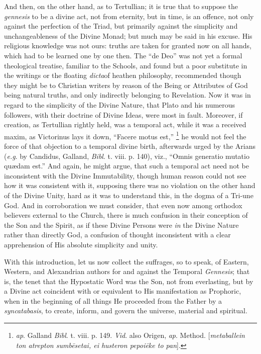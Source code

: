 And then, on the other hand, as to Tertullian; it is true that to
suppose the \emph{gennesis} to be a divine act, not from eternity, but
in time, is an offence, not only against the perfection of the Triad,
but primarily against the simplicity and unchangeableness of the
Divine Monad; but much may be said in his excuse. His religious
knowledge was not ours: truths are taken for granted now on all hands,
which had to be learned one by one then. The ``de Deo'' was
not yet a formal theological treatise, familiar to the Schools, and
found but a poor substitute in the writings or the floating \emph{dicta}of
heathen philosophy, recommended though they might be to Christian
writers by reason of the Being or Attributes of God being natural
truths, and only indirectly belonging to Revelation. Now it was in
regard to the simplicity of the Divine Nature, that Plato and his
numerous followers, with their doctrine of Divine Ideas, were most in
fault. Moreover, if creation, as Tertullian rightly held, was a
temporal act, while it was a received maxim, as Victorinus lays it
down, ``Facere motus est,'' \footnote{\emph{ap}.
Galland \emph{Bibl}. t. viii. p. 149. \emph{Vid}. also Origen, \emph{ap}.
Method. [\emph{metaballein ton atrepton sumb\={e}setai, ei husteron
pepoi\={e}ke to pan}].} he would not feel the force of that objection to a temporal
divine birth, afterwards urged by the Arians (\emph{e.g}. by Candidus,
Galland, \emph{Bibl}. t. viii. p. 140), viz., ``Omnis generatio
mutatio quædam est.'' And again, he might argue, that such a
temporal act need not be inconsistent with the Divine Immutability,
though human reason could not see how it was consistent with it,
supposing there was no violation on the other hand of the Divine
Unity, hard as it was to understand this, in the dogma of a Tri-une
God. And in corroboration we must consider, that even now among
orthodox believers external to the Church, there is much confusion in
their conception of the Son and the Spirit, as if these Divine Persons
were \emph{in} the Divine Nature rather than directly God, a confusion
of thought inconsistent with a clear apprehension of His absolute
simplicity and unity.

With this introduction, let us now collect the suffrages, so to
speak, of Eastern, Western, and Alexandrian authors for and against
the Temporal \emph{Gennesis}; that is, the tenet that the Hypostatic
Word was the Son, not from everlasting, but by a Divine act coincident
with or equivalent to His manifestation as Prophoric, when in the
beginning of all things He proceeded from the Father by a \emph{syncatabasis},
to create, inform, and govern the universe, material and spiritual.

